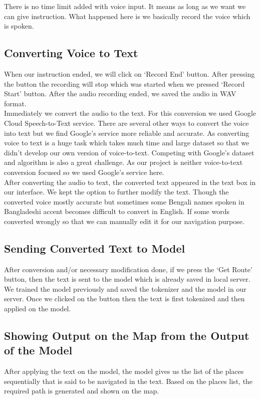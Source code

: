 There is no time limit added with voice input. It means as long as we want we can give instruction. What happened here is we basically record the voice which is spoken.


\subsection{Converting Voice to Text}
When our instruction ended, we will click on `Record End' button. After pressing the button the recording will stop which was started when we pressed `Record Start' button. After the audio recording ended, we saved the audio in WAV format. \\

Immediately we convert the audio to the text. For this conversion we used Google Cloud Speech-to-Text service. There are several other ways to convert the voice into text but we find Google's service more reliable and accurate. As converting voice to text is a huge task which takes much time and large dataset so that we didn't develop our own version of voice-to-text. Competing with Google's dataset and algorithm is also a great challenge. As our project is neither voice-to-text conversion focused so we used Google's service here.\\

After converting the audio to text, the converted text appeared in the text box in our interface. We kept the option to further modify the text. Though the converted voice mostly accurate but sometimes some Bengali names spoken in Bangladeshi accent becomes difficult to convert in English. If some words converted wrongly so that we can manually edit it for our navigation purpose.


\subsection{Sending Converted Text to Model}
After conversion and/or necessary modification done, if we press the `Get Route' button, then the text is sent to the model which is already saved in local server. We trained the model previously and saved the tokenizer and the model in our server. Once we clicked on the button then the text is first tokenized and then applied on the model.

\subsection{Showing Output on the Map from the Output of the Model}
After applying the text on the model, the model gives us the list of the places sequentially that is said to be navigated in the text. Based on the places list, the required path is generated and shown on the map.


